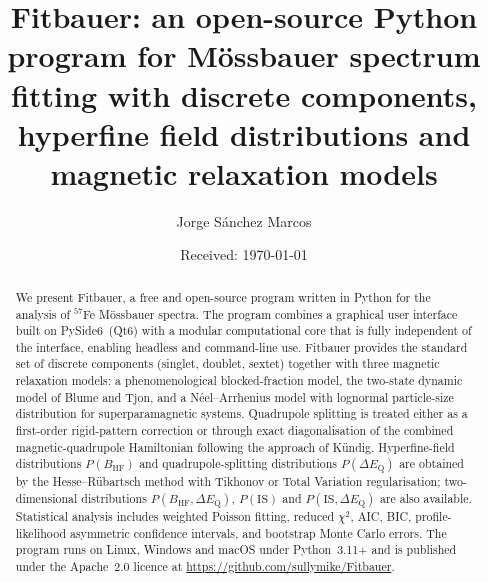 \documentclass[smallcondensed]{svjour3}
\begin{document}
\title{Fitbauer: an open-source Python program for Mössbauer spectrum fitting
       with discrete components, hyperfine field distributions and magnetic
       relaxation models}

\author{Jorge Sánchez Marcos}


\date{Received: \today}

\maketitle

\begin{abstract}
We present Fitbauer, a free and open-source program written in Python for
the analysis of $^{57}$Fe Mössbauer spectra. The program combines a
graphical user interface built on PySide6~(Qt6) with a modular computational
core that is fully independent of the interface, enabling headless and
command-line use. Fitbauer provides the standard set of discrete components
(singlet, doublet, sextet) together with three magnetic relaxation models:
a phenomenological blocked-fraction model, the two-state dynamic model of
Blume and Tjon, and a Néel--Arrhenius model with lognormal particle-size
distribution for superparamagnetic systems. Quadrupole splitting is treated
either as a first-order rigid-pattern correction or through exact
diagonalisation of the combined magnetic-quadrupole Hamiltonian following
the approach of Kündig. Hyperfine-field distributions $P(B_\mathrm{HF})$ and
quadrupole-splitting distributions $P(\Delta E_\mathrm{Q})$ are obtained by
the Hesse--Rübartsch method with Tikhonov or Total Variation regularisation;
two-dimensional distributions $P(B_\mathrm{HF},\Delta E_\mathrm{Q})$,
$P(\mathrm{IS})$ and $P(\mathrm{IS},\Delta E_\mathrm{Q})$ are also
available. Statistical analysis includes weighted Poisson fitting,
reduced $\chi^2$, AIC, BIC, profile-likelihood asymmetric confidence
intervals, and bootstrap Monte Carlo errors. The program runs on Linux,
Windows and macOS under Python~3.11+ and is published under the Apache~2.0
licence at \url{https://github.com/sullymike/Fitbauer}.
\end{abstract}

\end{document}
